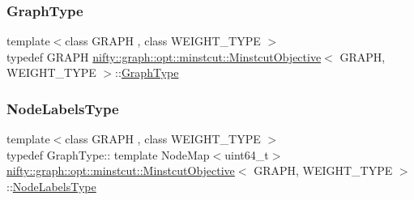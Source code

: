 \subsubsection{\texorpdfstring{Graph\+Type}{GraphType}}
{\footnotesize\ttfamily template$<$class G\+R\+A\+PH , class W\+E\+I\+G\+H\+T\+\_\+\+T\+Y\+PE $>$ \\
typedef G\+R\+A\+PH \hyperlink{classnifty_1_1graph_1_1opt_1_1minstcut_1_1MinstcutObjective}{nifty\+::graph\+::opt\+::minstcut\+::\+Minstcut\+Objective}$<$ G\+R\+A\+PH, W\+E\+I\+G\+H\+T\+\_\+\+T\+Y\+PE $>$\+::\hyperlink{classnifty_1_1graph_1_1opt_1_1minstcut_1_1MinstcutObjective_a8d416ff18d747ac8ac242dde0e1406c0}{Graph\+Type}}

\mbox{\label{classnifty_1_1graph_1_1opt_1_1minstcut_1_1MinstcutObjective_ac450f5d647c4c29de17ab11ecf5d8d84}} 
\subsubsection{\texorpdfstring{Node\+Labels\+Type}{NodeLabelsType}}
{\footnotesize\ttfamily template$<$class G\+R\+A\+PH , class W\+E\+I\+G\+H\+T\+\_\+\+T\+Y\+PE $>$ \\
typedef Graph\+Type\+:: template Node\+Map$<$uint64\+\_\+t$>$ \hyperlink{classnifty_1_1graph_1_1opt_1_1minstcut_1_1MinstcutObjective}{nifty\+::graph\+::opt\+::minstcut\+::\+Minstcut\+Objective}$<$ G\+R\+A\+PH, W\+E\+I\+G\+H\+T\+\_\+\+T\+Y\+PE $>$\+::\hyperlink{classnifty_1_1graph_1_1opt_1_1minstcut_1_1MinstcutObjective_ac450f5d647c4c29de17ab11ecf5d8d84}{Node\+Labels\+Type}}

\mbox{\label{classnifty_1_1graph_1_1opt_1_1minstcut_1_1MinstcutObjective_a1662c8902f85cd5d0aa046c5657ee0f2}} 
